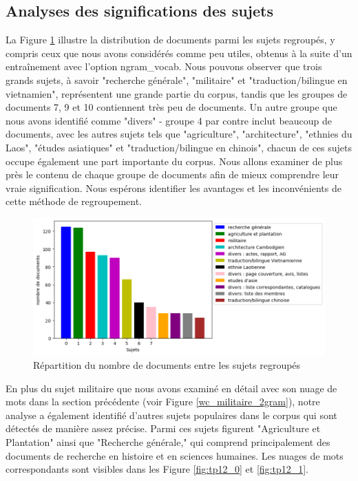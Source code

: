 \subsection{Analyses des significations des sujets}

La Figure \ref{fig:topic_size_docs} illustre la distribution de documents parmi les sujets regroupés, y compris ceux que nous avons considérés comme peu utiles, obtenus à la suite d'un entraînement avec l'option ngram\_vocab. Nous pouvons observer que trois grands sujets, à savoir "recherche générale", "militaire" et "traduction/bilingue en vietnamien", représentent une grande partie du corpus, tandis que les groupes de documents 7, 9 et 10 contiennent très peu de documents. Un autre groupe que nous avons identifié  comme "divers" - groupe 4 par contre inclut beaucoup de documents, avec les autres sujets tels que "agriculture", "architecture", "ethnies du Laos", "études asiatiques" et "traduction/bilingue en chinois", chacun de ces sujets occupe également une part importante du corpus. Nous allons examiner de plus près le contenu de chaque groupe de documents afin de mieux comprendre leur vraie signification. Nous espérons identifier les avantages et les inconvénients de cette méthode de regroupement.

\begin{figure}[H] %
    \centering
    \includegraphics[width=14cm]{img/topic_size_docs.png}
    \caption{Répartition du nombre de documents entre les sujets regroupés}
    \label{fig:topic_size_docs}
\end{figure}

En plus du sujet militaire que nous avons examiné en détail avec son nuage de mots dans la section précédente (voir Figure \ref{wc_militaire_2gram}), notre analyse a également identifié d'autres sujets populaires dans le corpus qui sont détectés de manière assez précise. Parmi ces sujets figurent "Agriculture et Plantation" ainsi que "Recherche générale," qui comprend principalement des documents de recherche en histoire et en sciences humaines. Les nuages de mots correspondants sont visibles dans les Figure \ref{fig:tp12_0} et \ref{fig:tp12_1}.

